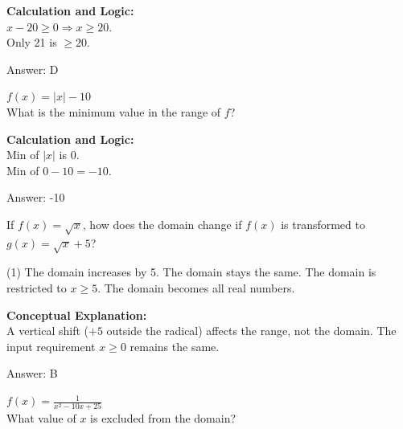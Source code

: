 \documentclass[11pt,paper=a4,answers]{exam}
\begin{document}
\begin{questions}
\begin{solution}
\textbf{Calculation and Logic:} \\
$x - 20 \geq 0 \Rightarrow x \geq 20$. \\
Only 21 is $\geq 20$.

\vspace{30pt}

Answer: \colorbox{yellow!100}{D}
\end{solution}

\vspace{40pt}

\question
$f(x) = |x| - 10$ \\
What is the minimum value in the range of $f$?

\begin{solution}
\textbf{Calculation and Logic:} \\
Min of $|x|$ is 0. \\
Min of $0 - 10 = -10$.

\vspace{30pt}

Answer: \colorbox{yellow!100}{-10}
\end{solution}

\vspace{40pt}

\question
If $f(x) = \sqrt{x}$, how does the domain change if $f(x)$ is transformed to $g(x) = \sqrt{x} + 5$?
\begin{tasks}(1)
    \task The domain increases by 5.
    \task The domain stays the same.
    \task The domain is restricted to $x \geq 5$.
    \task The domain becomes all real numbers.
\end{tasks}

\begin{solution}
\textbf{Conceptual Explanation:} \\
A vertical shift ($+5$ outside the radical) affects the range, not the domain. The input requirement $x \geq 0$ remains the same.

\vspace{30pt}

Answer: \colorbox{yellow!100}{B}
\end{solution}

\vspace{40pt}

\question
$f(x) = \frac{1}{x^2 - 10x + 25}$ \\
What value of $x$ is excluded from the domain?


\end{questions}
\end{document}
